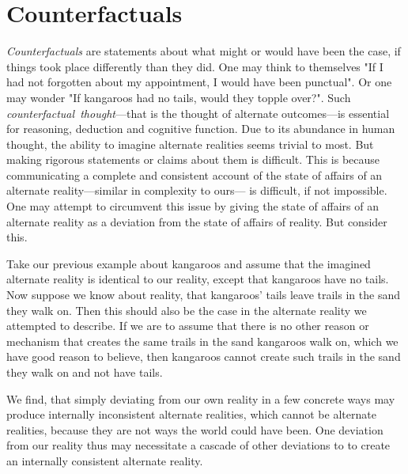 \documentclass[a4paper,american,10pt]{paper}
\theoremstyle{definition}\newtheorem{lemma}[thm]{Lemma}
\theoremstyle{definition}\newtheorem{proposition}[thm]{Proposition}
\theoremstyle{definition}\newtheorem{corollary}[thm]{Corollary}
\theoremstyle{definition}\newtheorem{definition}{Definition}
\begin{document}
\section{Counterfactuals}\label{sec:counterfactuals}
\textit{Counterfactuals} are statements about what might or would have been the case, if things took place differently than they did. One may think to themselves "If I had not forgotten about my appointment, I would have been punctual". Or one may wonder "If kangaroos had no tails, would they topple over?". Such \textit{counterfactual~thought}---that is the thought of alternate outcomes---is essential for reasoning, deduction and cognitive function. \cite{byrne_counterfactual_2016} Due to its abundance in human thought, the ability to imagine alternate realities seems trivial to most. But making rigorous statements or claims about them is difficult. This is because communicating a complete and consistent account of the state of affairs of an alternate reality---similar in complexity to ours--- is difficult, if not impossible. One may attempt to circumvent this issue by giving the state of affairs of an alternate reality as a deviation from the state of affairs of reality. But consider this.
\begin{examplef}
Take our previous example about kangaroos and assume that the imagined alternate reality is identical to our reality, except that kangaroos have no tails. Now suppose we know about reality, that kangaroos' tails leave trails in the sand they walk on. Then this should also be the case in the alternate reality we attempted to describe. If we are to assume that there is no other reason or mechanism that creates the same trails in the sand kangaroos walk on, which we have good reason to believe, then kangaroos cannot create such trails in the sand they walk on and not have tails.
\end{examplef}
We find, that simply deviating from our own reality in a few concrete ways may produce internally inconsistent alternate realities, which cannot be alternate realities, because they are not ways the world could have been. One deviation from our reality thus may necessitate a cascade of other deviations to to create an internally consistent alternate reality.
\end{document}
